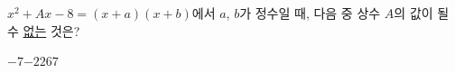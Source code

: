 $x^2+Ax-8=(x+a)(x+b)$에서 $a$, $b$가 정수일 때, 다음 중 상수 $A$의 값이 될 수 \underline{없는} 것은?
\begin{choices32}{$-7$}{$-2$}{$2$}{$6$}{$7$}\end{choices32}
